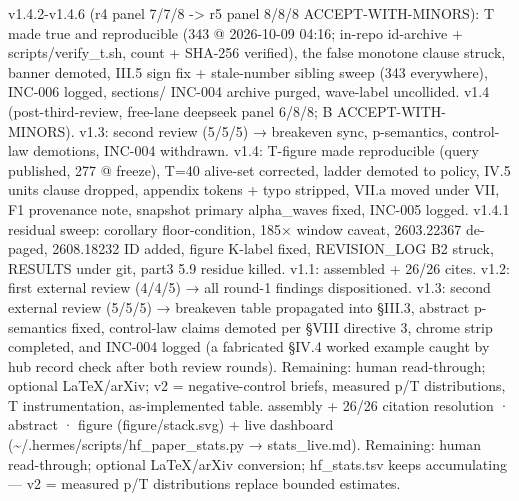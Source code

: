 \documentclass[
]{article}
\begin{document}
v1.4.2-v1.4.6 (r4 panel 7/7/8 -\textgreater{} r5 panel 8/8/8
ACCEPT-WITH-MINORS): T made true and reproducible (343 @ 2026-10-09
04:16; in-repo id-archive + scripts/verify\_t.sh, count + SHA-256
verified), the false monotone clause struck, banner demoted, III.5 sign
fix + stale-number sibling sweep (343 everywhere), INC-006 logged,
sections/ INC-004 archive purged, wave-label uncollided. v1.4
(post-third-review, free-lane deepseek panel 6/8/8; B
ACCEPT-WITH-MINORS). v1.3: second review (5/5/5) → breakeven sync,
p-semantics, control-law demotions, INC-004 withdrawn. v1.4: T-figure
made reproducible (query published, 277 @ freeze), T=40 alive-set
corrected, ladder demoted to policy, IV.5 units clause dropped, appendix
tokens + typo stripped, VII.a moved under VII, F1 provenance note,
snapshot primary alpha\_waves fixed, INC-005 logged. v1.4.1 residual
sweep: corollary floor-condition, 185× window caveat, 2603.22367
de-paged, 2608.18232 ID added, figure K-label fixed, REVISION\_LOG B2
struck, RESULTS under git, part3 5.9 residue killed. v1.1: assembled +
26/26 cites. v1.2: first external review (4/4/5) → all round-1 findings
dispositioned. v1.3: second external review (5/5/5) → breakeven table
propagated into §III.3, abstract p-semantics fixed, control-law claims
demoted per §VIII directive 3, chrome strip completed, and INC-004
logged (a fabricated §IV.4 worked example caught by hub record check
after both review rounds). Remaining: human read-through; optional
LaTeX/arXiv; v2 = negative-control briefs, measured p/T distributions, T
instrumentation, as-implemented table. assembly + 26/26 citation
resolution · abstract · figure (figure/stack.svg) + live dashboard
(\textasciitilde/.hermes/scripts/hf\_paper\_stats.py → stats\_live.md).
Remaining: human read-through; optional LaTeX/arXiv conversion;
hf\_stats.tsv keeps accumulating --- v2 = measured p/T distributions
replace bounded estimates.
\end{document}
